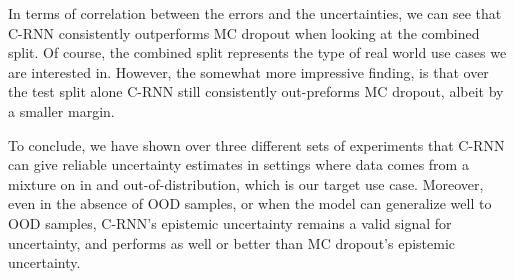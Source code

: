 \documentclass[../main.tex]{subfiles}
\begin{document}
In terms of correlation between the errors and the uncertainties, we can see that C-RNN consistently outperforms MC dropout when looking at the combined split. Of course, the combined split represents the type of real world use cases we are interested in. However, the somewhat more impressive finding, is that over the test split alone C-RNN still consistently out-preforms MC dropout, albeit by a smaller margin.  

To conclude, we have shown over three different sets of experiments that C-RNN can give reliable uncertainty estimates in settings where data comes from a mixture on in and out-of-distribution, which is our target use case. Moreover, even in the absence of OOD samples, or when the model can generalize well to OOD samples, C-RNN's epistemic uncertainty remains a valid signal for uncertainty, and performs as well or better than MC dropout's epistemic uncertainty. 

\end{document}
